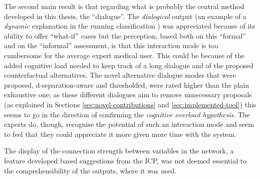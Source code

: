 The second main result is that regarding what is probably the central method developed in this thesis, the \enquote{dialogue}.
The \textit{dialogical} output (an example of a \textit{dynamic} explanation in the running classification \citep{lacave2002review}) was appreciated because of its ability to offer \enquote{what-if} cases but the perception, based both on this \enquote{formal} and on the \enquote{informal} assessment, is that this interaction mode is too cumbersome for the average expert medical user.
This could be because of the added cognitive load needed to keep track of a long dialogue and of the proposed counterfactual alternatives.
The novel alternative dialogue modes that were proposed, d-separation-aware and thresholded, were rated higher than the plain exhaustive one; as these different dialogues aim to remove unnecessary proposals (as explained in Sections \ref{sec:novel-contributions} and \ref{sec:implemented-tool}) this seems to go in the direction of confirming the \textit{cognitive overload hypothesis}.
The experts do, though, recognise the potential of such an interaction mode and seem to feel that they could appreciate it more given more time with the system.

The display of the connection strength between variables in the network, a feature developed based suggestions from the ICP, was not deemed essential to the comprehensibility of the outputs, where it was used.

